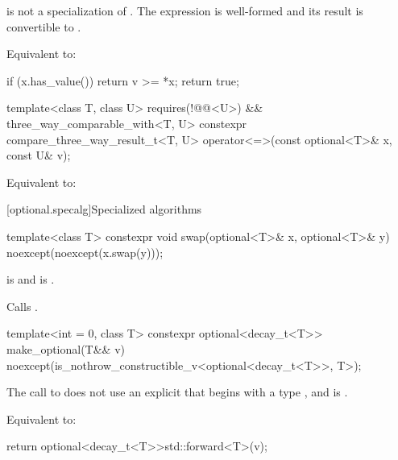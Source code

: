 \begin{itemdescr}
\pnum
\constraints
{} is not a specialization of . The expression  is well-formed and its result is convertible to .

\pnum
\effects
Equivalent to:
\begin{codeblock}
if (x.has_value())
  return v >= *x;
return true;
\end{codeblock}
\end{itemdescr}

%
\begin{itemdecl}
template<class T, class U>
  requires(!@@<U>) && three_way_comparable_with<T, U>
  constexpr compare_three_way_result_t<T, U> operator<=>(const optional<T>& x, const U& v);
\end{itemdecl}

\begin{itemdescr}
\pnum
\effects
Equivalent to: 
\end{itemdescr}

[optional.specalg]{Specialized algorithms}

%
\begin{itemdecl}
template<class T>
  constexpr void swap(optional<T>& x, optional<T>& y) noexcept(noexcept(x.swap(y)));
\end{itemdecl}

\begin{itemdescr}
\pnum
\constraints
{} is  and  is .

\pnum
\effects
Calls .
\end{itemdescr}

%
\begin{itemdecl}
template<int = 0, class T>
  constexpr optional<decay_t<T>> make_optional(T&& v) noexcept(is_nothrow_constructible_v<optional<decay_t<T>>, T>);
\end{itemdecl}

\begin{itemdescr}
\pnum
\constraints
The call to  does not use an explicit  that begins with a type , and  is .

\pnum
\effects
Equivalent to:
\begin{codeblock}
return optional<decay_t<T>>{std::forward<T>(v)};
\end{codeblock}
\end{itemdescr}

